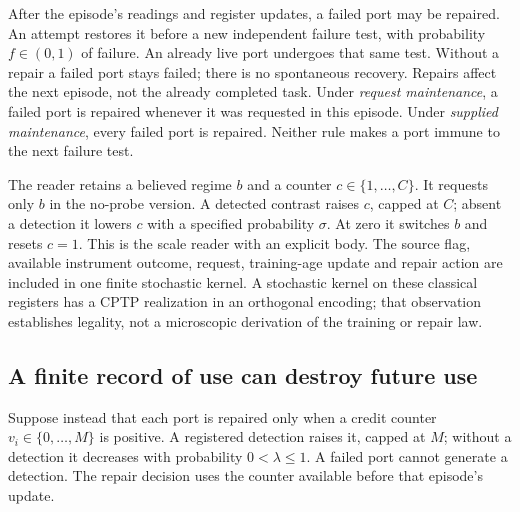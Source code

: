 \documentclass[11pt,a4paper]{article}
\begin{document}
After the episode's readings and register updates, a failed port may
be repaired. An attempt restores it before a new independent failure
test, with probability $f\in(0,1)$ of failure. An already live port
undergoes that same test. Without a repair a failed port stays failed;
there is no spontaneous recovery. Repairs affect the next episode,
not the already completed task. Under \emph{request maintenance}, a
failed port is repaired whenever it was requested in this episode.
Under \emph{supplied maintenance}, every failed port is repaired.
Neither rule makes a port immune to the next failure test.

The reader retains a believed regime $b$ and a counter
$c\in\{1,\ldots,C\}$. It requests only $b$ in the no-probe version.
A detected contrast raises $c$, capped at $C$; absent a detection it
lowers $c$ with a specified probability $\sigma$. At zero it switches
$b$ and resets $c=1$. This is the scale reader with an explicit body.
The source flag, available instrument outcome, request, training-age
update and repair action are included in one finite stochastic kernel.
A stochastic kernel on these classical registers has a CPTP
realization in an orthogonal encoding; that observation establishes
legality, not a microscopic derivation of the training or repair law.

\subsection{A finite record of use can destroy future use}

Suppose instead that each port is repaired only when a credit counter
$v_i\in\{0,\ldots,M\}$ is positive. A registered detection raises it,
capped at $M$; without a detection it decreases with probability
$0<\lambda\leq1$. A failed port cannot generate a detection. The repair
decision uses the counter available before that episode's update.
\end{document}
